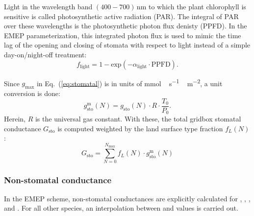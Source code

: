 \documentclass[gmd, manuscript]{copernicus}
\begin{document}
Light in the wavelength band $(400-700)$\,\unit{nm} to which the plant chlorophyll is sensitive is called photosynthetic active radiation (PAR). The integral of PAR over these wavelengths is the photosynthetic photon flux denisty (PPFD). In the EMEP parameterization, this integrated photon flux is used to mimic the time lag of the opening and closing of stomata with respect to light instead of a simple day-on/night-off treatment:
\begin{equation}
  f_\text{light} = 1-\text{exp}(-\alpha_\text{light}\cdot \text{PPFD}).
  \label{eq:flight}
\end{equation}

Since $g_\text{max}$ in Eq.~(\ref{eq:stomatal}) is in units of \unit{mmol\,s^{-1}\,m^{-2}}, a unit conversion is done:
\begin{equation}
  g^\text{m}_{\text{sto}}(N) = g_{\text{sto}}(N) \cdot R \cdot \frac{T_0}{P_0}.
\end{equation}
Herein, $R$ is the universal gas constant. With these, the total gridbox stomatal conductance $G_\text{sto}$ is computed weighted by the land surface type fraction $f_L(N)$:
\begin{equation}
  G_\text{sto} = \sum_{N=0}^{N_\text{max}} f_L(N)\cdot g^\text{m}_{\text{sto}}(N)
\end{equation}

\subsubsection*{Non-stomatal conductance}
In the EMEP scheme, non-stomatal conductances are explicitly calculated for , , , and . For all other species, an interpolation between  and  values is carried out.
\end{document}
